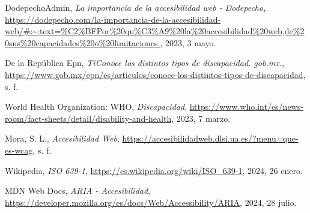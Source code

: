 \documentclass[]{article}
\begin{document}
\begin{thebibliography}{9}
	DodepechoAdmin, 
	\emph{La importancia de la accesibilidad web - Dodepecho}, 
	\url{https://dodepecho.com/la-importancia-de-la-accesibilidad-web/#:~:text=%C2%BFPor%20qu%C3%A9%20la%20accesibilidad%20web,de%20sus%20capacidades%20o%20limitaciones.}, 
	2023, 3 mayo.
	
	De la República Epn, 
	\emph{TíConoce los distintos tipos de discapacidad. gob.mx.}, 
	\url{https://www.gob.mx/epn/es/articulos/conoce-los-distintos-tipos-de-discapacidad}, 
	s. f.
	
	World Health Organization: WHO, 
	\emph{Discapacidad}, 
	\url{https://www.who.int/es/news-room/fact-sheets/detail/disability-and-health}, 
	2023, 7 marzo.
	
	Mora, S. L., 
	\emph{Accesibilidad Web}, 
	\url{https://accesibilidadweb.dlsi.ua.es/?menu=que-es-wcag}, 
	s. f.
	
	Wikipedia, 
	\emph{ISO 639-1}, 
	\url{https://es.wikipedia.org/wiki/ISO_639-1}, 
	2024, 26 enero.
	
	MDN Web Docs, 
	\emph{ARIA - Accesibilidad}, 
	\url{https://developer.mozilla.org/es/docs/Web/Accessibility/ARIA}, 
	2024, 28 julio.

\end{thebibliography}
\end{document}
